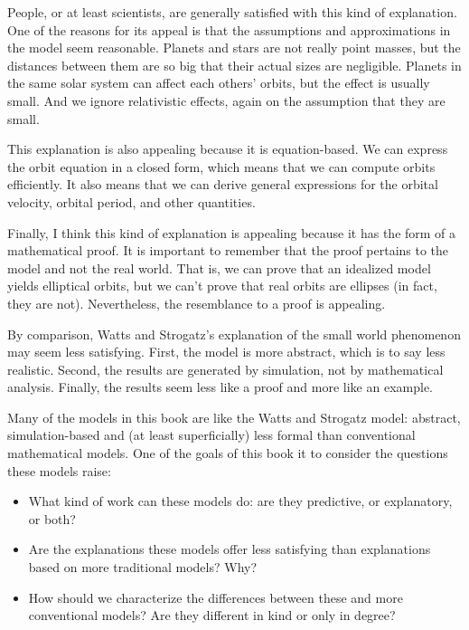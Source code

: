 \documentclass[12pt]{book}
\theoremstyle{exercise}
\begin{document}

People, or at least scientists, are generally satisfied with
this kind of explanation.  One of the reasons for its appeal
is that the assumptions and approximations in the model seem
reasonable.  Planets and stars are not really point masses,
but the distances between them are so big that their actual
sizes are negligible.  Planets in the same solar system can
affect each others' orbits, but the effect is usually small.
And we ignore relativistic effects, again on the assumption that
they are small.


This explanation is also appealing because it is equation-based.
We can express the orbit equation in a closed form, which means
that we can compute orbits efficiently.  It also means that
we can derive general expressions for the orbital velocity,
orbital period, and other quantities.


Finally, I think this kind of explanation is appealing because
it has the form of a mathematical proof.
It is important to remember that the proof pertains to the
model and not the real world.
That is, we can prove that
an idealized model yields elliptical orbits, but
we can't prove that real orbits are ellipses (in
fact, they are not).
Nevertheless, the resemblance to a proof is appealing.


By comparison, Watts and Strogatz's explanation of the small
world phenomenon may seem less satisfying.  First, the model
is more abstract, which is to say less realistic.  Second,
the results are generated by simulation, not by mathematical
analysis.  Finally, the results seem less like a proof and
more like an example.


Many of the models in this book are like the Watts and Strogatz model:
abstract, simulation-based and (at least superficially) less formal
than conventional mathematical models.  One of the goals of this book
it to consider the questions these models raise:


\begin{itemize}

\item What kind of work can these models do: are they predictive, or
  explanatory, or both?

\item Are the explanations these models offer less satisfying than
  explanations based on more traditional models?  Why?

\item How should we characterize the differences between these and
  more conventional models?  Are they different in kind or only in
  degree?

\end{itemize}
\end{document}
